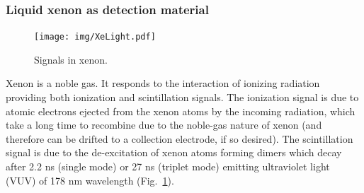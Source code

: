 \subsubsection*{Liquid xenon as detection material}



\begin{figure}[!bhtp]
	\centering
	\texttt{[image: img/XeLight.pdf]}
	\caption{\label{fig.xe} Signals in xenon.}
\end{figure}

Xenon is a noble gas. It responds to the interaction of ionizing radiation providing both ionization and scintillation signals. The ionization signal is due to atomic electrons ejected from the xenon atoms by the incoming radiation, which take a long time to recombine due to the noble-gas nature of xenon (and therefore can be drifted to a collection electrode, if so desired). The scintillation signal is due to the de-excitation of xenon atoms forming dimers which decay after 2.2 ns (single mode) or 27 ns (triplet mode) emitting ultraviolet light (VUV) of 178 nm wavelength (Fig.~\ref{fig.xe}).

